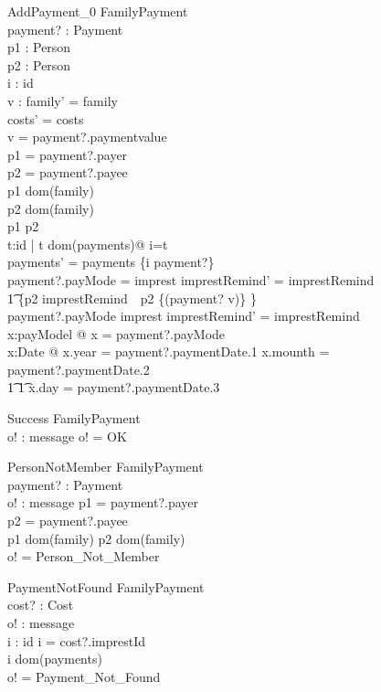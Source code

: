 \documentclass{article}
\begin{document}
\begin{schema}{AddPayment_0}
\Delta FamilyPayment\\
payment? : Payment\\
p1 : Person\\
p2 : Person\\
i : id\\
v : \nat
\where
family' = family\\
costs' = costs\\
v = payment?.paymentvalue\\
p1 = payment?.payer\\
p2 = payment?.payee\\
p1 \in dom(family)\\
p2 \in dom(family)\\
p1 \neq p2\\
\exists t:id | t \notin dom(payments)@ i=t\\
payments' = payments \cup \{i \mapsto payment?\}\\
payment?.payMode = imprest \implies imprestRemind' = imprestRemind \oplus \\
\t1 \{p2 \mapsto imprestRemind~~p2 \cup \{(payment? \mapsto v)\} \}\\
payment?.payMode \neq imprest \implies imprestRemind' = imprestRemind\\
\exists x:payModel @ x = payment?.payMode\\
\exists x:Date @ x.year = payment?.paymentDate.1 \land x.mounth = payment?.paymentDate.2 \land\\
\t1 \t1 x.day = payment?.paymentDate.3
\end{schema}

\begin{schema}{Success}
\Xi FamilyPayment\\
o! : message
\where
o! = OK
\end{schema}

\begin{schema}{PersonNotMember}
\Xi FamilyPayment\\
payment? : Payment\\
o! : message
\where
p1 = payment?.payer\\
p2 = payment?.payee\\
p1 \notin dom(family) \lor p2 \notin dom(family)\\
o! = ‫‪Person‬‬_‫‪Not‬‬_‫‪Member‬‬
\end{schema}

\begin{schema}{PaymentNotFound}
\Xi FamilyPayment\\
cost? : Cost\\
o! : message\\
i : id
\where
i = cost?.imprestId\\
i \notin dom(payments)\\
o! = ‫‪Payment‬‬_‫‪Not‬‬_‫‪Found
\end{schema}
\end{document}
